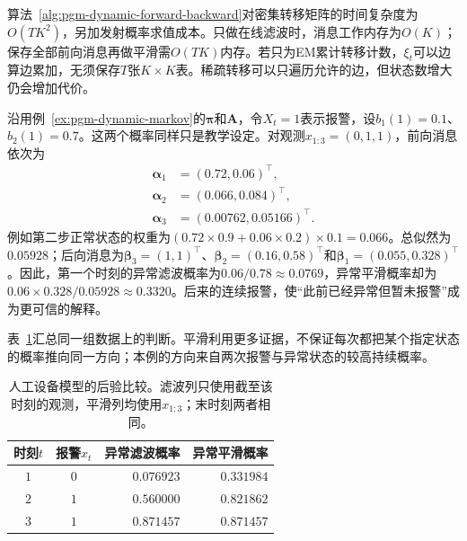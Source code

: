 算法~\ref{alg:pgm-dynamic-forward-backward}对密集转移矩阵的时间复杂度为$O(TK^2)$，另加发射概率求值成本。只做在线滤波时，消息工作内存为$O(K)$；保存全部前向消息再做平滑需$O(TK)$内存。若只为EM累计转移计数，$\xi_t$可以边算边累加，无须保存$T$张$K\times K$表。稀疏转移可以只遍历允许的边，但状态数增大仍会增加代价。

\begin{example}[报警证据怎样改变过去的判断]
  \label{ex:pgm-dynamic-hmm}
  沿用例~\ref{ex:pgm-dynamic-markov}的$\bm{\pi}$和$\bm{A}$，令$X_t=1$表示报警，设$b_1(1)=0.1$、$b_2(1)=0.7$。这两个概率同样只是教学设定。对观测$x_{1:3}=(0,1,1)$，前向消息依次为
  \[
    \begin{aligned}
      \bm{\alpha}_1&=(0.72,0.06)^\top,\\
      \bm{\alpha}_2&=(0.066,0.084)^\top,\\
      \bm{\alpha}_3&=(0.00762,0.05166)^\top.
    \end{aligned}
  \]
  例如第二步正常状态的权重为$(0.72\times0.9+0.06\times0.2)\times0.1=0.066$。总似然为$0.05928$；后向消息为$\bm{\beta}_3=(1,1)^\top$、$\bm{\beta}_2=(0.16,0.58)^\top$和$\bm{\beta}_1=(0.055,0.328)^\top$。因此，第一个时刻的异常滤波概率为$0.06/0.78\approx0.0769$，异常平滑概率却为$0.06\times0.328/0.05928\approx0.3320$。后来的连续报警，使“此前已经异常但暂未报警”成为更可信的解释。
\end{example}

表~\ref{tab:pgm-dynamic-hmm-example}汇总同一组数据上的判断。平滑利用更多证据，不保证每次都把某个指定状态的概率推向同一方向；本例的方向来自两次报警与异常状态的较高持续概率。

\begin{table}[htbp]
  \centering
  \begin{tabular}{ccrr}
    \toprule
    时刻$t$ & 报警$x_t$ & 异常滤波概率 & 异常平滑概率 \\
    \midrule
    $1$ & $0$ & $0.076923$ & $0.331984$ \\
    $2$ & $1$ & $0.560000$ & $0.821862$ \\
    $3$ & $1$ & $0.871457$ & $0.871457$ \\
    \bottomrule
  \end{tabular}
  \caption{人工设备模型的后验比较。滤波列只使用截至该时刻的观测，平滑列均使用$x_{1:3}$；末时刻两者相同。}
  \label{tab:pgm-dynamic-hmm-example}
\end{table}

